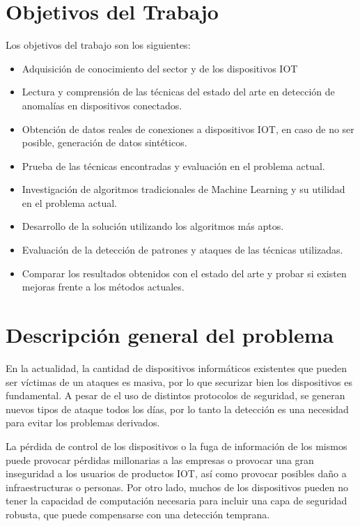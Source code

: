 \section{Objetivos del Trabajo}
Los objetivos del trabajo son los siguientes:

\begin{itemize}
  \item Adquisición de conocimiento del sector y de los dispositivos IOT
  \item Lectura y comprensión de las técnicas del estado del arte en detección de anomalías en dispositivos conectados.
  \item Obtención de datos reales de conexiones a dispositivos IOT, en caso de no ser posible, generación de datos sintéticos.
  \item Prueba de las técnicas encontradas y evaluación en el problema actual.
  \item Investigación de algoritmos tradicionales de Machine Learning y su utilidad en el problema actual.
  \item Desarrollo de la solución utilizando los algoritmos más aptos.
  \item Evaluación de la detección de patrones y ataques de las técnicas utilizadas.
  \item Comparar los resultados obtenidos con el estado del arte y probar si existen mejoras frente a los métodos actuales.
\end{itemize}

\section{Descripción general del problema}

En la actualidad, la cantidad de dispositivos informáticos existentes que pueden ser víctimas de un ataques es masiva, por lo que securizar bien los dispositivos es fundamental. A pesar de el uso de distintos protocolos de seguridad, se generan nuevos tipos de ataque todos los días, por lo tanto la detección es una necesidad para evitar los problemas derivados.

\vspace{0.5cm}

La pérdida de control de los dispositivos o la fuga de información de los mismos puede provocar pérdidas millonarias a las empresas o provocar una gran inseguridad a los usuarios de productos IOT, así como provocar posibles daño a infraestructuras o personas. Por otro lado, muchos de los dispositivos pueden no tener la capacidad de computación necesaria para incluir una capa de seguridad robusta, que puede compensarse con una detección temprana. 


